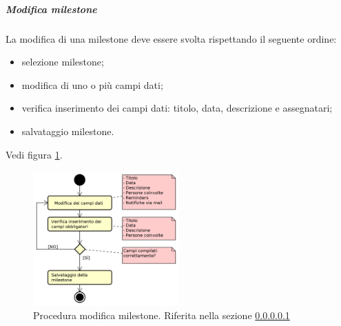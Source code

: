             \subparagraph{Modifica milestone}\label{sec:modificamilestone}
			La modifica di una milestone deve essere svolta rispettando il seguente ordine:
    			\begin{itemize}
    				\item selezione milestone;
    				\item modifica di uno o più campi dati;
    				\item verifica inserimento dei campi dati: titolo, data, descrizione e assegnatari;
    				\item salvataggio milestone.
    			\end{itemize}
                Vedi figura \ref{fig:procmodmilestone}.
        		\begin{figure}[h!]
                    \centering
        			\includegraphics[width=0.5\textwidth]{img/proc_mod_milestone}
        			\caption{Procedura modifica milestone. Riferita nella sezione \ref{sec:modificamilestone}}
                    \label{fig:procmodmilestone}
        		\end{figure}\mbox{}\\
